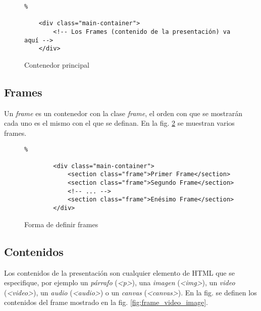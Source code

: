 		\begin{figure}[htb]%
			\begin{lstlisting}%

	<div class="main-container">
    	<!-- Los Frames (contenido de la presentación) va aquí -->
	</div>
			\end{lstlisting}
		\caption{Contenedor principal}
		\label{fig:main_container}
		\end{figure}		


		\subsection{Frames} %
		 \label{sub:frames}
		 
		  
			Un \textit{frame} es un contenedor con la clase \textit{frame}, el orden con que se mostrarán cada uno es el mismo con el que se definan. En la fig. \ref{fig:frames_html} se muestran varios frames.


				\begin{figure}[htb]%
					\begin{lstlisting}%

		<div class="main-container">
    		<section class="frame">Primer Frame</section>
    		<section class="frame">Segundo Frame</section>
    		<!-- ... -->
    		<section class="frame">Enésimo Frame</section>
		</div> 
					\end{lstlisting}
					\caption{Forma de definir frames}
					\label{fig:frames_html}
				\end{figure}		

		\subsection{Contenidos} %
		\label{sub:contenidos}
			Los contenidos de la presentación son cualquier elemento de HTML que se especifique, por ejemplo un \textit{párrafo} (\textit{<p>}), una \textit{imagen} (\textit{<img>}), un \textit{video} (\textit{<video>}), un \textit{audio} (\textit{<audio>}) o un \textit{canvas} (\textit{<canvas>}). En la fig. se definen los contenidos del frame mostrado en la fig. \ref{fig:frame_video_image}.

